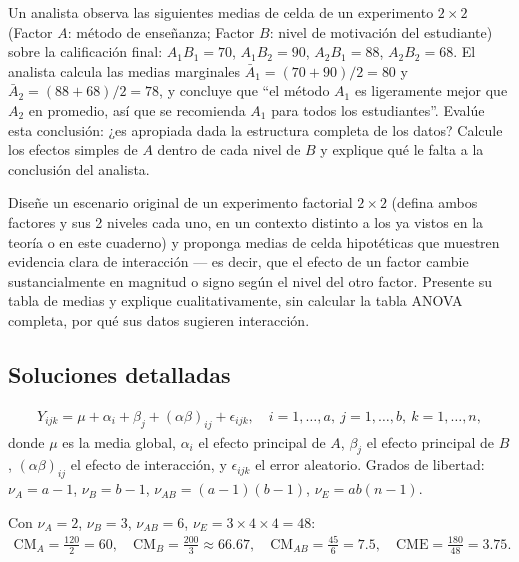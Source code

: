 \begin{problema}
	\label{prob:5ffa1be}
	Un analista observa las siguientes medias de celda de un experimento $2 \times 2$ (Factor $A$: método de enseñanza; Factor $B$: nivel de motivación del estudiante) sobre la calificación final: $A_1B_1 = 70$, $A_1B_2 = 90$, $A_2B_1 = 88$, $A_2B_2 = 68$. El analista calcula las medias marginales $\bar{A}_1 = (70+90)/2 = 80$ y $\bar{A}_2 = (88+68)/2 = 78$, y concluye que ``el método $A_1$ es ligeramente mejor que $A_2$ en promedio, así que se recomienda $A_1$ para todos los estudiantes''. Evalúe esta conclusión: ¿es apropiada dada la estructura completa de los datos? Calcule los efectos simples de $A$ dentro de cada nivel de $B$ y explique qué le falta a la conclusión del analista.
\end{problema}

\begin{problema}
	\label{prob:fc779e7}
	Diseñe un escenario original de un experimento factorial $2 \times 2$ (defina ambos factores y sus 2 niveles cada uno, en un contexto distinto a los ya vistos en la teoría o en este cuaderno) y proponga medias de celda hipotéticas que muestren evidencia clara de interacción — es decir, que el efecto de un factor cambie sustancialmente en magnitud o signo según el nivel del otro factor. Presente su tabla de medias y explique cualitativamente, sin calcular la tabla ANOVA completa, por qué sus datos sugieren interacción.
\end{problema}

\subsection*{Soluciones detalladas}

\begin{solproblema}[prob:11b9df2]
	\begin{align}
		Y_{ijk} = \mu + \alpha_i + \beta_j + (\alpha\beta)_{ij} + \epsilon_{ijk}, \quad i=1,\ldots,a,\ j=1,\ldots,b,\ k=1,\ldots,n,
	\end{align}
	donde $\mu$ es la media global, $\alpha_i$ el efecto principal de $A$, $\beta_j$ el efecto principal de $B$, $(\alpha\beta)_{ij}$ el efecto de interacción, y $\epsilon_{ijk}$ el error aleatorio. Grados de libertad: $\nu_A = a-1$, $\nu_B = b-1$, $\nu_{AB} = (a-1)(b-1)$, $\nu_E = ab(n-1)$.
\end{solproblema}

\begin{solproblema}[prob:196fe5a]
	Con $\nu_A = 2$, $\nu_B = 3$, $\nu_{AB} = 6$, $\nu_E = 3 \times 4 \times 4 = 48$:
	\begin{align}
		\text{CM}_A = \frac{120}{2} = 60, \quad \text{CM}_B = \frac{200}{3} \approx 66.67, \quad \text{CM}_{AB} = \frac{45}{6} = 7.5, \quad \text{CME} = \frac{180}{48} = 3.75.
	\end{align}
\end{solproblema}

